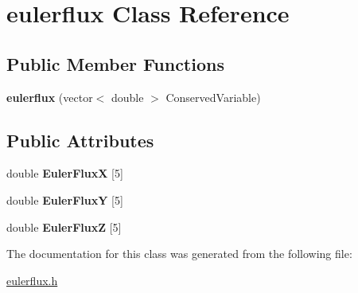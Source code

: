 \hypertarget{classeulerflux}{}\section{eulerflux Class Reference}
\label{classeulerflux}
\subsection*{Public Member Functions}
\begin{DoxyCompactItemize}
\item 
{\bfseries eulerflux} (vector$<$ double $>$ Conserved\+Variable)\hypertarget{classeulerflux_ac324f8901af730de4b90b885cc87ca41}{}\label{classeulerflux_ac324f8901af730de4b90b885cc87ca41}

\end{DoxyCompactItemize}
\subsection*{Public Attributes}
\begin{DoxyCompactItemize}
\item 
double {\bfseries Euler\+FluxX} \mbox{[}5\mbox{]}\hypertarget{classeulerflux_a0282624fae997ac54441271130497185}{}\label{classeulerflux_a0282624fae997ac54441271130497185}

\item 
double {\bfseries Euler\+FluxY} \mbox{[}5\mbox{]}\hypertarget{classeulerflux_afdebc952e09629e73d7dcdda3e9e60ce}{}\label{classeulerflux_afdebc952e09629e73d7dcdda3e9e60ce}

\item 
double {\bfseries Euler\+FluxZ} \mbox{[}5\mbox{]}\hypertarget{classeulerflux_aaf2a28c94cb1cad57800342f8496c4b2}{}\label{classeulerflux_aaf2a28c94cb1cad57800342f8496c4b2}

\end{DoxyCompactItemize}


The documentation for this class was generated from the following file\+:\begin{DoxyCompactItemize}
\item 
\hyperlink{eulerflux_8h}{eulerflux.\+h}\end{DoxyCompactItemize}
